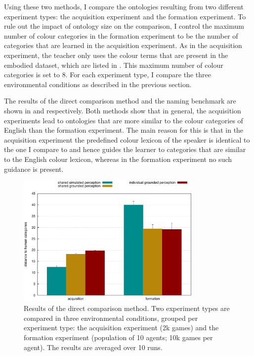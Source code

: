 Using these two methods, I compare the ontologies resulting from two
different experiment types: the acquisition experiment and the
formation experiment. To rule out the impact of ontology size on the
comparison, I control the maximum number of colour categories in the
formation experiment to be the number of categories that are learned
in the acquisition experiment. As in the acquisition experiment, the
teacher only uses the colour terms that are present in the embodied
dataset, which are listed in . This
maximum number of colour categories is set to 8. For each experiment
type, I compare the three environmental conditions as described in the
previous section.

The results of the direct comparison method and the naming benchmark
are shown in 
and  respectively. Both methods show that in
general, the acquisition experiments lead to ontologies that are more
similar to the colour categories of English than the formation
experiment. The main reason for this is that in the acquisition
experiment the predefined colour lexicon of the speaker is identical
to the one I compare to and hence guides the learner to categories
that are similar to the English colour lexicon, whereas in the
formation experiment no such guidance is present.

\begin{figure}[htbp]
\begin{center}
  \includegraphics[width=0.8\textwidth]{./experiments/figures/grounding-comparison-distance-to-human-categories.pdf}
  \caption[Direct comparison between formed grounded colour category
  systems and the English colour categories]{Results of the direct
    comparison method. Two experiment types are compared in three
    environmental conditions, grouped per experiment type: the
    acquisition experiment (2k games) and the formation experiment
    (population of 10 agents; 10k games per agent). The results are
    averaged over 10 runs.}
\label{f:comparison-distance-to-human-categories}
\end{center}
\end{figure}

